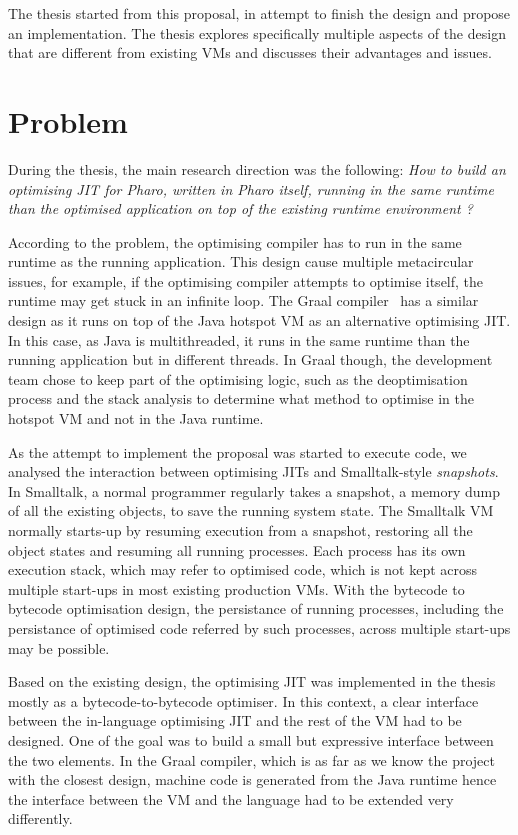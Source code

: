 \documentclass[a4paper,12pt,twoside]{../includes/ThesisStyle}
\begin{document}
The thesis started from this proposal, in attempt to finish the design and propose an implementation. The thesis explores specifically multiple aspects of the design that are different from existing VMs and discusses their advantages and issues.

\section{Problem}

During the thesis, the main research direction was the following:
\emph{How to build an optimising JIT for Pharo, written in Pharo itself, running in the same runtime than the optimised application on top of the existing runtime environment ?} 

According to the problem, the optimising compiler has to run in the same runtime as the running application. This design cause multiple metacircular issues, for example, if the optimising compiler attempts to optimise itself, the runtime may get stuck in an infinite loop. The Graal compiler~\cite{Dubo13c} has a similar design as it runs on top of the Java hotspot VM as an alternative optimising JIT. In this case, as Java is multithreaded, it runs in the same runtime than the running application but in different threads. In Graal though, the development team chose to keep part of the optimising logic, such as the deoptimisation process and the stack analysis to determine what method to optimise in the hotspot VM and not in the Java runtime. 

As the attempt to implement the proposal was started to execute code, we analysed the interaction between optimising JITs and Smalltalk-style \emph{snapshots}. In Smalltalk, a normal programmer regularly takes a snapshot, a memory dump of all the existing objects, to save the running system state. The Smalltalk VM normally starts-up by resuming execution from a snapshot, restoring all the object states and resuming all running processes. Each process has its own execution stack, which may refer to optimised code, which is not kept across multiple start-ups in most existing production VMs. With the bytecode to bytecode optimisation design, the persistance of running processes, including the persistance of optimised code referred by such processes, across multiple start-ups may be possible.

Based on the existing design, the optimising JIT was implemented in the thesis mostly as a bytecode-to-bytecode optimiser. In this context, a clear interface between the in-language optimising JIT and the rest of the VM had to be designed. One of the goal was to build a small but expressive interface between the two elements. In the Graal compiler, which is as far as we know the project with the closest design, machine code is generated from the Java runtime hence the interface between the VM and the language had to be extended very differently.
\end{document}
